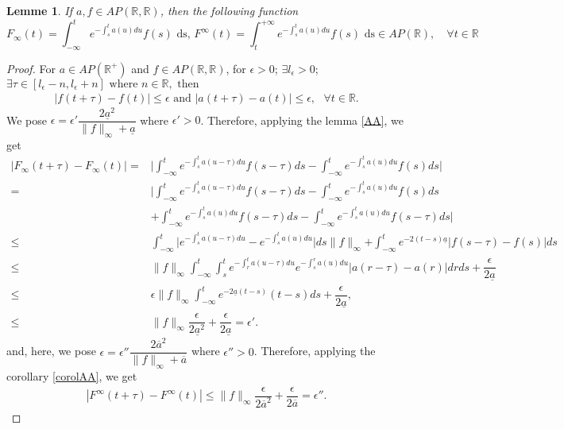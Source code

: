 \documentclass[[a4paper,10pt]{article}
\newcommand{\R}{\mathbb{R}}
\newtheorem{lemma}[theorem]{Lemme}%
\begin{document}
\begin{lemma}\label{APinteg}
 If $a,f \in AP(\R,\R)$, then the following function
 $$F_{\infty}(t) =\displaystyle \int^t_{-\infty} e^{-\int^t_s a(u)du}f(s)\text{ ds, }F^{\infty}(t) =\displaystyle \int_t^{+\infty} e^{-\int^t_s a(u)du}f(s)\text{ ds} \in AP(\R),\quad\forall t\in \R $$
 \end{lemma}
 \begin{proof}
 For $a \in AP(\R^+)$ and $f\in AP(\R,\R)$, for $ \epsilon >0$; $\exists l_\epsilon>0$; 
$ \exists \tau \in [l_\epsilon-n, l_\epsilon+n]\text{ where } n\in \R, \text{ then }$
$$\begin{array}{lll}

 |f(t+\tau)-f(t)|\leq \epsilon \text{ and }  |a(t+\tau)-a(t)|\leq \epsilon, \text{ } \forall t\in \R.
\end{array}$$
We pose $\epsilon=\epsilon'\dfrac{2\underline{a}^2}{\|f\|_{\infty}+\underline{a}}$ where $\epsilon'>0$.
Therefore, applying the lemma \ref{AA}, we get 
$$\begin{aligned}
\displaystyle{|F_\infty(t+\tau)-F_\infty(t)|}
=&\bigg|\displaystyle{\int^{t}_{-\infty} e^{-\int^{t}_{s}a(u-\tau)du} f(s-\tau) ds-\int^t_{-\infty}e ^{-\int^t_s a(u)du}f(s)ds\bigg|}\\
=&\bigg|\displaystyle{\int^{t}_{-\infty} e^{-\int^{t}_{s}a(u-\tau)du} f(s-\tau) ds-\int^t_{-\infty}e ^{-\int^t_s a(u)du}f(s)ds}\\
&\displaystyle{+\int^{t}_{-\infty} e^{-\int^{t}_{s}a(u)du} f(s-\tau) ds-\int^{t}_{-\infty} e^{-\int^{t}_{s}a(u)du} f(s-\tau) ds\bigg|}\\
\leq&\displaystyle{\int^t_{-\infty}\bigg|e^{- \int^t_s a(u-\tau)du}-e ^{-\int^t_s a(u)du}\bigg|ds \|f\|_{\infty}}\displaystyle{+\int^t_{-\infty} e^{-2(t-s)\underline{a}}|f(s-\tau)-f(s)|ds}\\
\leq& \displaystyle{ \|f\|_{\infty}\int^t_{-\infty}\int^t_s e^{-\int^t_r a(u-\tau)du}
e^{-\int^r_s a(u)du}|a(r-\tau)-a(r)|drds}+\dfrac{\epsilon}{2\underline{a}} \\
\leq& \displaystyle{\epsilon \|f\|_{\infty}\int^t_{-\infty} e^{-2\underline{a}(t-s)}(t-s)ds}+\dfrac{\epsilon}{2\underline{a}},\\
\leq& \displaystyle{ \|f\|_{\infty}\dfrac{\epsilon }{2\underline{a}^2}+\dfrac{\epsilon}{2\underline{a}}}=\epsilon'.
\end{aligned}
$$
and,
here, we pose $\epsilon=\epsilon''\dfrac{2\overline{a}^2}{\|f\|_{\infty}+\overline{a}}$ where $\epsilon''>0$.
Therefore, applying the corollary \ref{corolAA}, we get 
$$\begin{aligned}
\displaystyle{|F^\infty(t+\tau)-F^\infty(t)|}
\leq \displaystyle{ \|f\|_{\infty}\dfrac{\epsilon }{2\overline{a}^2}+\dfrac{\epsilon}{2\overline{a}}}=\epsilon''.
\end{aligned}
$$
 \end{proof}
\end{document}
